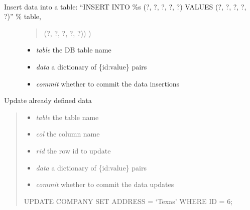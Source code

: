 \documentclass[a4paper,11pt,english]{sphinxmanual}
\begin{document}
\begin{fulllineitems}
\begin{fulllineitems}
\end{fulllineitems}


\begin{fulllineitems}
\label{modules_doc:cbmpy.CBNetDB.DBTools.insertData}~\begin{description}
\item[{Insert data into a table: ``INSERT INTO \%s (?, ?, ?, ?, ?) VALUES (?, ?, ?, ?, ?)'' \% table,}] \leavevmode\begin{quote}

(?, ?, ?, ?, ?)) )
\end{quote}
\begin{itemize}
\item {} 
\emph{table} the DB table name

\item {} 
\emph{data} a dictionary of \{id:value\} pairs

\item {} 
\emph{commit} whether to commit the data insertions

\end{itemize}

\end{description}

\end{fulllineitems}


\begin{fulllineitems}
\label{modules_doc:cbmpy.CBNetDB.DBTools.updateData}
Update already defined data
\begin{quote}
\begin{itemize}
\item {} 
\emph{table} the table name

\item {} 
\emph{col} the column name

\item {} 
\emph{rid} the row id to update

\item {} 
\emph{data} a dictionary of \{id:value\} pairs

\item {} 
\emph{commit} whether to commit the data updates

\end{itemize}

UPDATE COMPANY SET ADDRESS = `Texas' WHERE ID = 6;
\end{quote}

\end{fulllineitems}


\end{fulllineitems}
\end{document}

